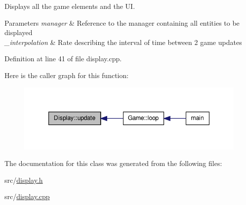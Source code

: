 Displays all the game elements and the U\-I. 


\begin{DoxyParams}{Parameters}
{\em manager} & Reference to the manager containing all entities to be displayed \\
\hline
{\em \-\_\-interpolation} & Rate describing the interval of time between 2 game updates \\
\hline
\end{DoxyParams}


Definition at line 41 of file display.\-cpp.



Here is the caller graph for this function\-:\nopagebreak
\begin{figure}[H]
\begin{center}
\leavevmode
\includegraphics[width=344pt]{class_display_a713ee81045f32895c2b063037c81c388_icgraph}
\end{center}
\end{figure}




The documentation for this class was generated from the following files\-:\begin{DoxyCompactItemize}
\item 
src/\hyperlink{display_8h}{display.\-h}\item 
src/\hyperlink{display_8cpp}{display.\-cpp}\end{DoxyCompactItemize}
